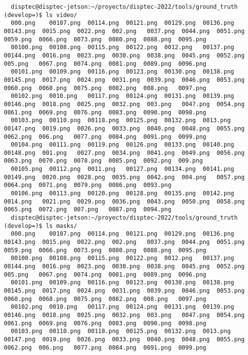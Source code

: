 \documentclass[12pt,oneside]{book}
\begin{document}
\begin{lstlisting}
  disptec@disptec-jetson:~/proyecto/disptec-2022/tools/ground_truth (develop=)$ ls video/
  000.png    00107.png  00114.png  00121.png  00129.png  00136.png  00143.png  0015.png  0022.png  002.png   0037.png  0044.png  0051.png  0059.png  0066.png  0073.png  0080.png  0088.png  0095.png
  00100.png  00108.png  00115.png  00122.png  0012.png   00137.png  00144.png  0016.png  0023.png  0030.png  0038.png  0045.png  0052.png  005.png   0067.png  0074.png  0081.png  0089.png  0096.png
  00101.png  00109.png  00116.png  00123.png  00130.png  00138.png  00145.png  0017.png  0024.png  0031.png  0039.png  0046.png  0053.png  0060.png  0068.png  0075.png  0082.png  008.png   0097.png
  00102.png  0010.png   00117.png  00124.png  00131.png  00139.png  00146.png  0018.png  0025.png  0032.png  003.png   0047.png  0054.png  0061.png  0069.png  0076.png  0083.png  0090.png  0098.png
  00103.png  00110.png  00118.png  00125.png  00132.png  0013.png   00147.png  0019.png  0026.png  0033.png  0040.png  0048.png  0055.png  0062.png  006.png   0077.png  0084.png  0091.png  0099.png
  00104.png  00111.png  00119.png  00126.png  00133.png  00140.png  00148.png  001.png   0027.png  0034.png  0041.png  0049.png  0056.png  0063.png  0070.png  0078.png  0085.png  0092.png  009.png
  00105.png  00112.png  0011.png   00127.png  00134.png  00141.png  00149.png  0020.png  0028.png  0035.png  0042.png  004.png   0057.png  0064.png  0071.png  0079.png  0086.png  0093.png
  00106.png  00113.png  00120.png  00128.png  00135.png  00142.png  0014.png   0021.png  0029.png  0036.png  0043.png  0050.png  0058.png  0065.png  0072.png  007.png   0087.png  0094.png
  disptec@disptec-jetson:~/proyecto/disptec-2022/tools/ground_truth (develop=)$ ls masks/
  000.png    00107.png  00114.png  00121.png  00129.png  00136.png  00143.png  0015.png  0022.png  002.png   0037.png  0044.png  0051.png  0059.png  0066.png  0073.png  0080.png  0088.png  0095.png
  00100.png  00108.png  00115.png  00122.png  0012.png   00137.png  00144.png  0016.png  0023.png  0030.png  0038.png  0045.png  0052.png  005.png   0067.png  0074.png  0081.png  0089.png  0096.png
  00101.png  00109.png  00116.png  00123.png  00130.png  00138.png  00145.png  0017.png  0024.png  0031.png  0039.png  0046.png  0053.png  0060.png  0068.png  0075.png  0082.png  008.png   0097.png
  00102.png  0010.png   00117.png  00124.png  00131.png  00139.png  00146.png  0018.png  0025.png  0032.png  003.png   0047.png  0054.png  0061.png  0069.png  0076.png  0083.png  0090.png  0098.png
  00103.png  00110.png  00118.png  00125.png  00132.png  0013.png   00147.png  0019.png  0026.png  0033.png  0040.png  0048.png  0055.png  0062.png  006.png   0077.png  0084.png  0091.png  0099.png

\end{lstlisting}
\end{document}
